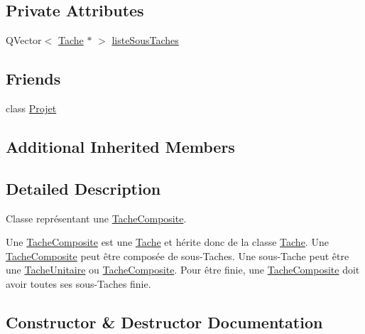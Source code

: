 \subsection*{Private Attributes}
\begin{DoxyCompactItemize}
\item 
Q\+Vector$<$ \hyperlink{class_tache}{Tache} $\ast$ $>$ \hyperlink{class_tache_composite_ac73545ce9cef80cbdc145a233465df6e}{liste\+Sous\+Taches}
\end{DoxyCompactItemize}
\subsection*{Friends}
\begin{DoxyCompactItemize}
\item 
class \hyperlink{class_tache_composite_ab87b41c3faa36955cc370972f5cce344}{Projet}
\end{DoxyCompactItemize}
\subsection*{Additional Inherited Members}


\subsection{Detailed Description}
Classe représentant une \hyperlink{class_tache_composite}{Tache\+Composite}. 

Une \hyperlink{class_tache_composite}{Tache\+Composite} est une \hyperlink{class_tache}{Tache} et hérite donc de la classe \hyperlink{class_tache}{Tache}. Une \hyperlink{class_tache_composite}{Tache\+Composite} peut être composée de sous-\/\+Taches. Une sous-\/\+Tache peut être une \hyperlink{class_tache_unitaire}{Tache\+Unitaire} ou \hyperlink{class_tache_composite}{Tache\+Composite}. Pour être finie, une \hyperlink{class_tache_composite}{Tache\+Composite} doit avoir toutes ses sous-\/\+Taches finie. 

\subsection{Constructor \& Destructor Documentation}
\hypertarget{class_tache_composite_a3042d6bf7df70fe0e56f314224fbae53}{}
